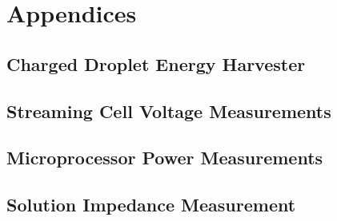 \part{Appendices}

  \appendix

  \chapter{Charged Droplet Energy Harvester}
    \label{appendix:chargedDropletts}
    

  \chapter{Streaming Cell Voltage Measurements}
    \label{appendix:streamingCellMeasurements}
    

  \chapter{Microprocessor Power Measurements}
    

  \chapter{Solution Impedance Measurement}
    


